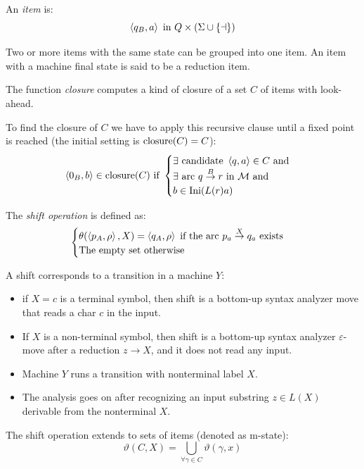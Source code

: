 \begin{definition}
    An \emph{item} is: 
    \[\left\langle q_B,a\right\rangle \textnormal{ in } Q \times (\Sigma \cup \{\dashv\})\]
\end{definition}
Two or more items with the same state can be grouped into one item. 
An item with a machine final state is said to be a reduction item. 

\begin{definition}
    The function \emph{closure} computes a kind of closure of a set $C$ of items with look-ahead. 
\end{definition}
To find the closure of $C$ we have to apply this recursive clause until a fixed point is reached (the initial setting is $\textnormal{closure}(C)=C$): 
\[
    \left\langle 0_B,b\right\rangle \in \textnormal{closure}(C) \textnormal{ if }
    \begin{cases}
        \exists \textnormal{ candidate } \left\langle q,a\right\rangle \in C \textnormal{ and} \\
        \exists \textnormal{ arc } q \overset{B}{\rightarrow} r \textnormal{ in } \mathcal{M} \textnormal{ and} \\
        b \in \textnormal{Ini}(L(r)a)
    \end{cases}
\]
\begin{definition}
    The \emph{shift operation} is defined as: 
    \[
    \begin{cases}
        \theta(\left\langle p_A,\rho\right\rangle,X)=\left\langle q_A,\rho\right\rangle \textnormal{ if the arc } p_a \overset{X}{\rightarrow} q_a \textnormal{ exists} \\
        \textnormal{The empty set otherwise}
    \end{cases}    
    \]
\end{definition}
A shift corresponds to a transition in a machine $Y$: 
\begin{itemize}
    \item if $X = c$ is a terminal symbol, then shift is a bottom-up syntax analyzer move that reads a char $c$ in the input. 
    \item If $X$ is a non-terminal symbol, then shift is a bottom-up syntax analyzer $\varepsilon$-move after a reduction $z \rightarrow X$, and it does not read any input.
    \item Machine $Y$ runs a transition with nonterminal label $X$. 
    \item The analysis goes on after recognizing an input substring $z \in L (X)$ derivable from the nonterminal $X$. 
\end{itemize}
The shift operation extends to sets of items (denoted as m-state): 
\[\vartheta(C,X)=\bigcup_{\forall \gamma \in C} \vartheta(\gamma,x)\]

